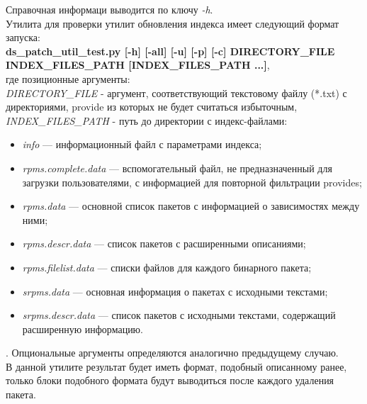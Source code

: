 Справочная информаци выводится по ключу \emph{-h}.\\


Утилита для проверки утилит обновления индекса имеет следующий формат запуска:\\
\textbf{ds\_patch\_util\_test.py [-h] [-all] [-u] [-p] [-c] DIRECTORY\_FILE INDEX\_FILES\_PATH [INDEX\_FILES\_PATH ...]},\\
 где
позиционные аргументы:\\
\emph{DIRECTORY\_FILE} - аргумент, соответствующий текстовому файлу (*.txt) с 
директориями, provide из которых не будет считаться избыточным,\\
\emph{INDEX\_FILES\_PATH} - путь до директории с индекс-файлами: \\
\begin{itemize}
\item{\textit{info} --- информационный файл с параметрами индекса;} 
\item{\textit{rpms.complete.data} --- вспомогательный файл, не предназначенный
для загрузки пользователями, с информацией для повторной фильтрации
provides;}
\item{\textit{rpms.data} --- основной список пакетов с информацией о зависимостях между ними;}
\item{\textit{rpms.descr.data} --- список пакетов с расширенными описаниями;}
\item{\textit{rpms.filelist.data} --- списки файлов для каждого бинарного пакета;}
\item{\textit{srpms.data} --- основная информация о пакетах с исходными текстами;}
\item{\textit{srpms.descr.data} --- список пакетов с исходными текстами, содержащий
расширенную информацию.}
\end{itemize}.
Опциональные аргументы определяются аналогично предыдущему случаю. \\
В данной утилите результат будет иметь  формат, подобный описанному ранее, 
только блоки подобного формата будут выводиться после каждого удаления пакета.


